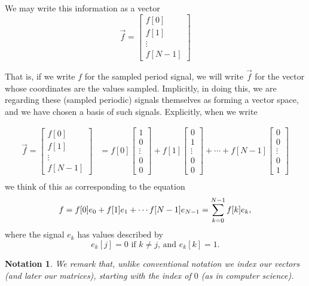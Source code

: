 \documentclass[12pt]{report}
\theoremstyle{plain}
\newtheorem{notn}[thm]{Notation}
\begin{document}
We may write this information as a vector
\[
\vec f =
\left[
\begin{matrix}
f[0] \\
f[1] \\
\vdots \\
f[N-1]
\end{matrix}
\right]
\]

That is, if we write $f$ for the sampled period signal, we will write $\vec f$ for the vector whose coordinates are the values sampled.
Implicitly, in doing this, we are regarding these (sampled periodic) signals themselves as forming a vector space, and we have chosen a basis of such signals. Explicitly, when we write

\begin{align*}
\vec f =
\left[
\begin{matrix}
f[0] \\
f[1] \\
\vdots \\
f[N-1]
\end{matrix}
\right]
&=
f[0]
\left[
\begin{matrix}
1 \\
0 \\
\vdots \\
0 \\
0
\end{matrix}
\right]
+
f[1]
\left[
\begin{matrix}
0 \\
1 \\
\vdots \\
0 \\
0
\end{matrix}
\right]
+
\cdots
+
f[N-1]
\left[
\begin{matrix}
0 \\
0 \\
\vdots \\
0 \\
1
\end{matrix}
\right] \\
\end{align*}
we think of this as corresponding to the equation
\[f = f[0]e_0 + f[1] e_1 + \cdots f[N-1]e_{N-1}\\
= \sum_{k = 0}^{N-1} f[k] e_k,
\]
where the signal $e_k$ has values described by
\[ e_k[j] = 0 \text{ if $k \neq j$, and } e_k[k] = 1. \]

\begin{notn}
We remark that, unlike conventional notation we index our vectors (and later our matrices), starting with the index of $0$ (as in computer science).
\end{notn}
\end{document}
